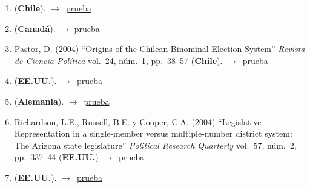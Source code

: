 \documentclass[12 pt, letter]{article}
\newenvironment{CitasMiTrabajo}{
    \begin{footnotesize}
    \begin{enumerate}[label={\footnotesize\emph{cita~\arabic*}},ref=\arabic*] %
        \setlength{\itemsep}{.1\itemsep}
        \setlength{\parskip}{.1\parskip}
    }{\end{enumerate}\end{footnotesize}}
\begin{document}
\begin{CitasMiTrabajo}
        \item {} (\textbf{Chile}). $\rightarrow$~\href{http://www.scielo.org.mx/scielo.php?pid=S1405-10792012000100005&script=sci_abstract&tlng=en}{prueba}
        
        \item {} (\textbf{Canad\'a}). $\rightarrow$ \href{https://www.cambridge.org/core/journals/canadian-journal-of-political-science-revue-canadienne-de-science-politique/article/its-the-christian-democrats-fault-declining-political-identification-in-chile-19572012/E13848612D0A6D6EB43DF3691B0FBA05}{prueba}
        
        \item Pastor, D. (2004)
        ``Origins of the Chilean Binominal Election System''
        \emph{Revista de Ciencia Pol\'itica} vol.\ 24, n\'um.\ 1, pp.\ 38--57
        (\textbf{Chile}). $\rightarrow$~\href{https://github.com/emagar/cv/blob/master/citasMiTrab/mrs/pastor2004rcp.pdf}{prueba}

        \item {} (\textbf{EE.UU.}). $\rightarrow$~\href{https://github.com/emagar/cv/blob/master/citasMiTrab/mrs/polga-siavelis2015es.pdf}{prueba}

        \item {} (\textbf{Alemania}). $\rightarrow$~\href{https://www.tandfonline.com/doi/ref/10.1080/13572334.2019.1603207?scroll=top}{prueba}

        \item Richardson, L.E., Russell, B.E. y Cooper, C.A. (2004)
        ``Legislative
        Representation in a single-member versus multiple-number district system:
        The Arizona state legislature'' \emph{Political Research Quarterly} vol.\ 57, n\'um.\ 2,
        pp.\ 337--44 (\textbf{EE.UU.}) $\rightarrow$~\href{https://github.com/emagar/cv/blob/master/citasMiTrab/mrs/richEtal.pdf}{prueba}

        \item {} (\textbf{EE.UU.}). $\rightarrow$~\href{https://onlinelibrary.wiley.com/doi/full/10.1111/lsq.12153?casa_token=S0uOmRb5GksAAAAA%3A7QFbgurL9wQ2Eb6U4mwDMBVT679An0VfZ357xfu5WSwrndg20jdzB4_uqcqtDwqHkVhVGqYS9iTQiQCtJQ}{prueba}
        

\end{CitasMiTrabajo}
\end{document}
